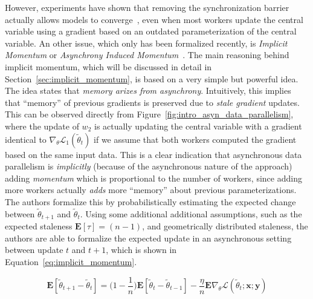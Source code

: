 However, experiments have shown that removing the synchronization barrier actually allows models to converge~\cite{dean2012large, zhang2015deep, hadjis2016omnivore}, even when most workers update the central variable using a gradient based on an outdated parameterization of the central variable. An other issue, which only has been formalized recently, is \emph{Implicit Momentum} or \emph{Asynchrony Induced Momentum}~\cite{implicitmomentum}. The main reasoning behind implicit momentum, which will be discussed in detail in Section~\ref{sec:implicit_momentum}, is based on a very simple but powerful idea. The idea states that \emph{memory arizes from asynchrony}. Intuitively, this implies that ``memory'' of previous gradients is preserved due to \emph{stale gradient} updates. This can be observed directly from Figure~\ref{fig:intro_asyn_data_parallelism}, where the update of $w_2$ is actually updating the central variable with a gradient identical to $\nabla_\theta \mathcal{L}_1(\tilde{\theta}_t)$ if we assume that both workers computed the gradient based on the same input data. This is a clear indication that asynchronous data parallelism is \emph{implicitly} (because of the asynchronous nature of the approach) adding \emph{momentum} which is proportional to the number of workers, since adding more workers actually \emph{adds} more ``memory'' about previous parameterizations. The authors formalize this by probabilistically estimating the expected change between $\tilde{\theta}_{t+1}$ and $\tilde{\theta}_t$. Using some additional additional assumptions, such as the expected staleness $\mathbf{E}[\tau] = (n - 1)$, and geometrically distributed staleness, the authors are able to formalize the expected update in an asynchronous setting between update $t$ and $t + 1$, which is shown in Equation~\ref{eq:implicit_momentum}.

\begin{equation}
  \label{eq:implicit_momentum}
  \mathbf{E}[\tilde{\theta}_{t+1} - \tilde{\theta}_t] = \Bigg( 1 - \frac{1}{n} \Bigg) \mathbf{E}[\tilde{\theta}_t - \tilde{\theta}_{t-1}] - \frac{\eta}{n} \mathbf{E} \nabla_\theta \mathcal{L}(\tilde{\theta}_t;\textbf{x};\textbf{y})
\end{equation}

